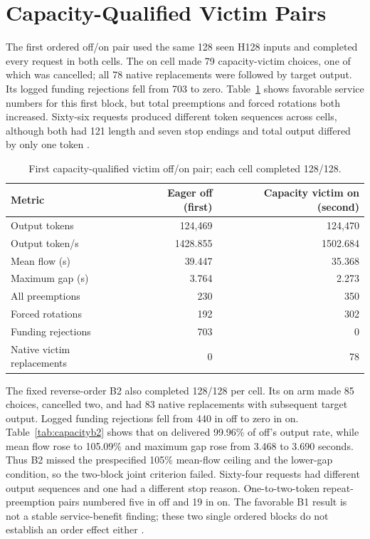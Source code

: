 \documentclass[10pt]{article}
\begin{document}
\section{Capacity-Qualified Victim Pairs}
The first ordered off/on pair used the same 128 seen H128 inputs and completed every request in both cells. The on cell made 79 capacity-victim choices, one of which was cancelled; all 78 native replacements were followed by target output. Its logged funding rejections fell from 703 to zero. Table~\ref{tab:capacity} shows favorable service numbers for this first block, but total preemptions and forced rotations both increased. Sixty-six requests produced different token sequences across cells, although both had 121 length and seven stop endings and total output differed by only one token \cite{capacitypair}.

\begin{table}[t]
\centering\small
\caption{First capacity-qualified victim off/on pair; each cell completed 128/128.}
\label{tab:capacity}
\begin{tabular}{lrr}
\toprule
Metric & Eager off (first) & Capacity victim on (second) \\
\midrule
Output tokens & 124,469 & 124,470 \\
Output token/s & 1428.855 & 1502.684 \\
Mean flow (s) & 39.447 & 35.368 \\
Maximum gap (s) & 3.764 & 2.273 \\
All preemptions & 230 & 350 \\
Forced rotations & 192 & 302 \\
Funding rejections & 703 & 0 \\
Native victim replacements & 0 & 78 \\
\bottomrule
\end{tabular}
\end{table}

The fixed reverse-order B2 also completed 128/128 per cell. Its on arm made 85 choices, cancelled two, and had 83 native replacements with subsequent target output. Logged funding rejections fell from 440 in off to zero in on. Table~\ref{tab:capacityb2} shows that on delivered 99.96\% of off's output rate, while mean flow rose to 105.09\% and maximum gap rose from 3.468 to 3.690 seconds. Thus B2 missed the prespecified 105\% mean-flow ceiling and the lower-gap condition, so the two-block joint criterion failed. Sixty-four requests had different output sequences and one had a different stop reason. One-to-two-token repeat-preemption pairs numbered five in off and 19 in on. The favorable B1 result is not a stable service-benefit finding; these two single ordered blocks do not establish an order effect either \cite{capacitypairb2}.
\end{document}
